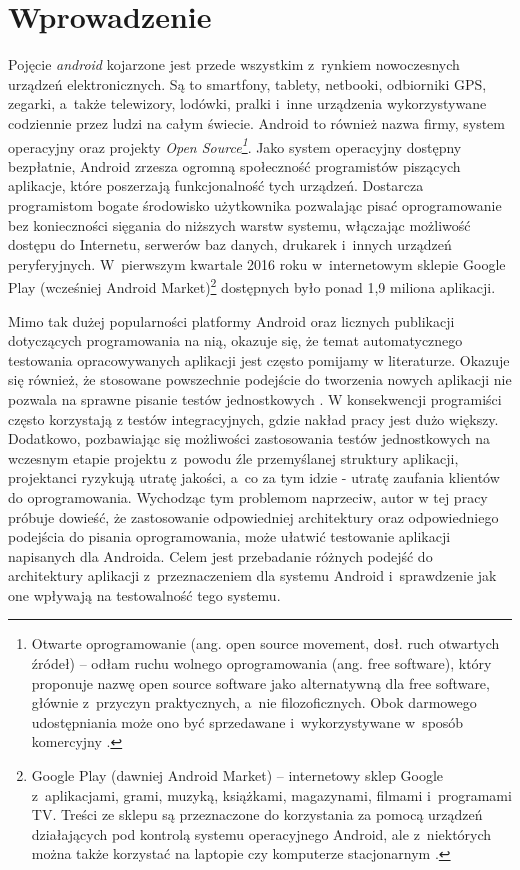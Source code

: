 \chapter{Wprowadzenie}
\label{wstep}

Pojęcie \textit{android} kojarzone jest przede wszystkim z~rynkiem nowoczesnych urządzeń elektronicznych. Są to smartfony, tablety, netbooki, odbiorniki GPS, zegarki, a~także telewizory, lodówki, pralki i~inne urządzenia wykorzystywane codziennie przez ludzi na całym świecie. Android to również nazwa firmy, system operacyjny oraz projekty \textit{Open Source\footnote{Otwarte oprogramowanie (ang. open source movement, dosł. ruch otwartych źródeł) – odłam ruchu wolnego oprogramowania (ang. free software), który proponuje nazwę open source software jako alternatywną dla free software, głównie z~przyczyn praktycznych, a~nie filozoficznych. Obok darmowego udostępniania może ono być sprzedawane i~wykorzystywane w~sposób komercyjny \cite{website:wikipedia}.}}. Jako system operacyjny dostępny bezpłatnie, Android zrzesza ogromną społeczność programistów piszących aplikacje, które poszerzają funkcjonalność tych urządzeń. Dostarcza programistom bogate środowisko użytkownika pozwalając pisać oprogramowanie bez konieczności sięgania do niższych warstw systemu, włączając możliwość dostępu do Internetu, serwerów baz danych, drukarek i~innych urządzeń peryferyjnych. W~pierwszym kwartale 2016 roku w~internetowym sklepie Google Play (wcześniej Android Market)\footnote{Google Play (dawniej Android Market) – internetowy sklep Google z~aplikacjami, grami, muzyką, książkami, magazynami, filmami i~programami TV. Treści ze sklepu są przeznaczone do korzystania za pomocą urządzeń działających pod kontrolą systemu operacyjnego Android, ale z~niektórych można także korzystać na laptopie czy komputerze stacjonarnym \cite{website:wikipedia}.} dostępnych było ponad 1,9 miliona aplikacji. 

Mimo tak dużej popularności platformy Android oraz licznych publikacji dotyczących programowania na nią, okazuje się, że temat automatycznego testowania opracowywanych aplikacji jest często pomijamy w literaturze. Okazuje się również, że stosowane powszechnie podejście do tworzenia nowych aplikacji nie pozwala na sprawne pisanie testów jednostkowych \cite{tematpracy}. W konsekwencji programiści często korzystają z testów integracyjnych, gdzie nakład pracy jest dużo większy. Dodatkowo, pozbawiając się możliwości zastosowania testów jednostkowych na wczesnym etapie projektu z~powodu źle przemyślanej struktury aplikacji, projektanci ryzykują utratę jakości, a~co za tym idzie - utratę zaufania klientów do oprogramowania. Wychodząc tym problemom naprzeciw, autor w tej pracy próbuje dowieść, że zastosowanie odpowiedniej architektury oraz odpowiedniego podejścia do pisania oprogramowania, może ułatwić testowanie aplikacji napisanych dla Androida. Celem jest przebadanie różnych podejść do architektury aplikacji z~przeznaczeniem dla systemu Android i~sprawdzenie jak one wpływają na testowalność tego systemu. 

